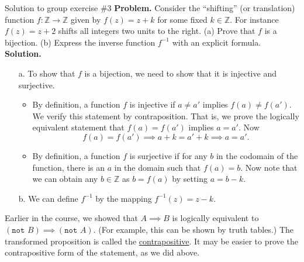 \documentclass[10pt]{beamer}
\begin{document}
\begin{frame}{Solution to group exercise \#3}
\footnotesize 
\textbf{Problem.} Consider the \enquote{shifting} (or translation) function $f: \mathbb{Z} \to \mathbb{Z}$ given by $f(z) = z+k$ for some fixed $k \in \mathbb{Z}$.  For instance $f(z) = z+2$ shifts all integers two units to the right.   (a) Prove that $f$ is a bijection. (b) Express the inverse function $f^{-1}$ with an explicit formula.  
\vfill
\textbf{Solution.}
\vspace{-0.2cm}
	\begin{itemize} \footnotesize 
		\item [a.] To show that $f$ is a bijection, we need to show that it is injective and surjective.
		\begin{itemize} \footnotesize 
		\item {}  By definition, a function $f$ is injective if $a \neq a'$ implies $f(a) \neq f(a')$.  We verify this statement by contraposition. That is, we prove the logically equivalent statement that $f(a) = f(a')$ implies $a =a'$. Now 
		\[f(a) = f(a') \implies a+k = a'+k \implies a=a'. \] 
		\item {}  By definition, a function $f$ is surjective if for any $b$ in the codomain of the function, there is an $a$ in the domain such that $f(a)=b$.  Now note that we can obtain any $b \in \mathbb{Z}$ as $b=f(a)$ by setting $a=b-k$.
		\end{itemize} 
		\item [b.] We can define $f^{-1}$ by the mapping $f^{-1}(z) = z-k.$
	\end{itemize} 
\vfill 
\begin{myredbox}[title=Remark: Proof by contraposition]
Earlier in the course, we showed that $A \implies B$ is logically equivalent to $(\texttt{not } B) \implies (\texttt{not } A)$.  (For example, this can be shown by truth tables.)  The transformed proposition is called the \underline{contrapositive}. It may be easier to prove the contrapositive form of the statement, as we did above.
\end{myredbox}

\end{frame}
\end{document}
